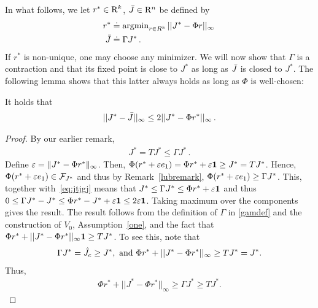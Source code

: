 In what follows, we let $r^*\in \mathrm{R}^k$, $\bar{J}\in \mathrm{R}^n$ be defined by
\begin{align*}
r^* & \doteq \operatorname{argmin}_{r\in R^k}||J^*-\Phi r||_\infty\,\\
\bar{J} & \doteq \Gamma J^*\,.
\end{align*}
If $r^*$ is non-unique, one may choose any minimizer.
We will now show that $\Gamma$ is a contraction and that its fixed point is close to $J^*$ as long as $\bar{J}$ is closed to $J^*$.
The following lemma shows that this latter always holds as long as $\Phi$ is well-chosen:
\begin{lemma}\label{bestbnd}
It holds that
\begin{align}
||J^*-\bar{J}||_\infty\leq 2||J^*-\Phi r^*||_\infty\,.
\end{align}
\end{lemma}
\begin{proof}
By our earlier remark, 
\begin{align} \label{eq:jtjgj}
J^* = T J^* \le \Gamma J^*\,.
\end{align}
Define $\varepsilon = \|J^* - \Phi r^*\|_{\infty}$. Then, $\Phi(r^* + \varepsilon e_1) = \Phi r^* + \varepsilon \mathbf{1} \ge J^* = TJ^*$.
Hence, $\Phi(r^* + \varepsilon e_1) \in \mathcal{F}_{J^*}$ and thus
by Remark~\ref{lubremark}, $\Phi(r^* + \varepsilon e_1) \ge \Gamma J^*$. This, together with~\eqref{eq:jtjgj} means that
$J^* \le \Gamma J^* \le \Phi r^* + \varepsilon \mathbf{1}$ and thus
$0 \le \Gamma J^* - J^* \le \Phi r^* - J^* + \varepsilon \mathbf{1} \le 2 \varepsilon \mathbf{1}$. Taking maximum over the components gives the result.
The result follows from the definition of $\Gamma$ in \eqref{gamdef} and the construction of $V_0$, Assumption~\ref{one}, and the fact that $\Phi r^*+||J^*-\Phi r^*||_\infty \mathbf{1}\geq TJ^*$. To see this, note that
\begin{align}
\Gamma J^*=\hat{J}_c \geq J^*,\nonumber \text{ and }
\Phi r^* +||J^*-\Phi r^*||_\infty\geq TJ^*= J^*.\nonumber
\end{align}
Thus,
\begin{align}
\Phi r^* +||J^*-\Phi r^*||_\infty\geq \Gamma J^*\geq TJ^*.
\end{align}
\fi
\end{proof}

